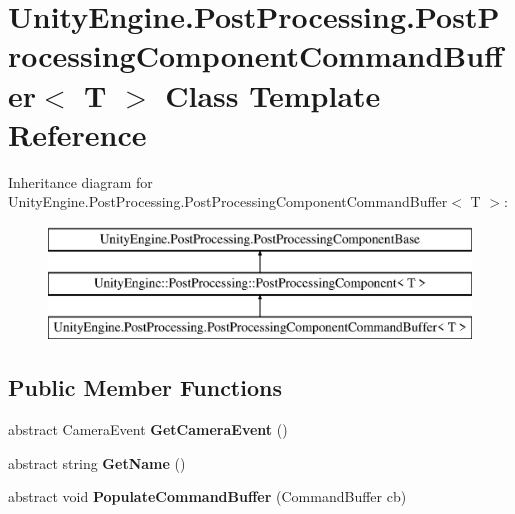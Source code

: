 \hypertarget{class_unity_engine_1_1_post_processing_1_1_post_processing_component_command_buffer}{}\section{Unity\+Engine.\+Post\+Processing.\+Post\+Processing\+Component\+Command\+Buffer$<$ T $>$ Class Template Reference}
\label{class_unity_engine_1_1_post_processing_1_1_post_processing_component_command_buffer}
Inheritance diagram for Unity\+Engine.\+Post\+Processing.\+Post\+Processing\+Component\+Command\+Buffer$<$ T $>$\+:\begin{figure}[H]
\begin{center}
\leavevmode
\includegraphics[height=3.000000cm]{class_unity_engine_1_1_post_processing_1_1_post_processing_component_command_buffer}
\end{center}
\end{figure}
\subsection*{Public Member Functions}
\begin{DoxyCompactItemize}
\item 
\mbox{\label{class_unity_engine_1_1_post_processing_1_1_post_processing_component_command_buffer_a762bd618a8e857e1b484ab8748fc6ab5}} 
abstract Camera\+Event {\bfseries Get\+Camera\+Event} ()
\item 
\mbox{\label{class_unity_engine_1_1_post_processing_1_1_post_processing_component_command_buffer_a7ea25da2189feccdbe69a0e2cafbda12}} 
abstract string {\bfseries Get\+Name} ()
\item 
\mbox{\label{class_unity_engine_1_1_post_processing_1_1_post_processing_component_command_buffer_a2ebd8748a9a219b4bf95d9a0e2056f3c}} 
abstract void {\bfseries Populate\+Command\+Buffer} (Command\+Buffer cb)
\end{DoxyCompactItemize}
